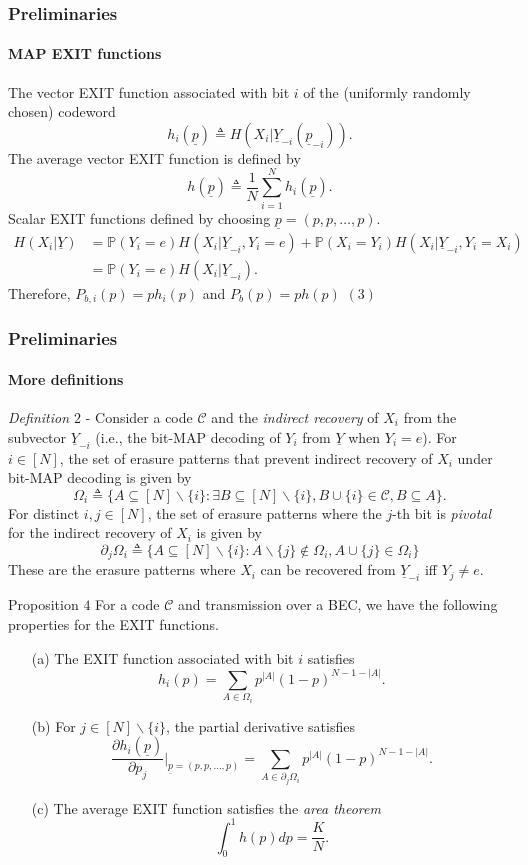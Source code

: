 \documentclass[xcolor=dvipsnames]{beamer}
\begin{document}
\begin{frame}
\frametitle{Preliminaries}
\framesubtitle{MAP EXIT functions}
The vector EXIT function associated with bit $i$ of the (uniformly randomly chosen) codeword $$h_i(\underline{p})\triangleq H(X_i | \underline{Y}_{-i}(\underline{p}_{-i})).$$ The average vector EXIT function is defined by $$h(\underline{p}) \triangleq \frac{1}{N}\sum_{i=1}^N h_i(\underline{p}).$$ Scalar EXIT functions defined by choosing $\underline{p}=(p,p,\ldots,p)$.
\begin{align*}
H(X_i|\underline{Y}) &= \mathbb{P}(Y_i=e)H(X_i|\underline{Y}_{-i}, Y_i=e) + \mathbb{P}(X_i=Y_i)H(X_i|\underline{Y}_{-i}, Y_i=X_i)\\
&= \mathbb{P}(Y_i=e)H(X_i|\underline{Y}_{-i}).
\end{align*}
Therefore, $P_{b,i}(p) = ph_i(p)$ and $P_b(p) = ph(p)$ \hspace{2cm}$(3)$
\end{frame}

\begin{frame}
\frametitle{Preliminaries}
\framesubtitle{More definitions}
\emph{Definition $2$} - Consider a code $\mathcal{C}$ and the \emph{indirect recovery} of $X_i$ from the subvector $\underline{Y}_{-i}$ (i.e., the bit-MAP decoding of $Y_i$ from $\underline{Y}$ when $Y_i=e$). For $i \in [N]$, the set of erasure patterns that prevent indirect recovery of $X_i$ under bit-MAP decoding is given by $$\Omega_i \triangleq \{A \subseteq [N]\backslash\{i\} : \exists B \subseteq [N]\backslash\{i\}, B \cup \{i\} \in \mathcal{C}, B \subseteq A\}.$$ For distinct $i,j \in [N]$, the set of erasure patterns where the $j$-th bit is \emph{pivotal} for the indirect recovery of $X_i$ is given by $$\partial_j\Omega_i \triangleq \{A \subseteq [N]\backslash\{i\}: A\backslash \{j\} \notin \Omega_i, A \cup \{j\} \in \Omega_i \}$$ These are the erasure patterns where $X_i$ can be recovered from $\underline{Y}_{-i}$ iff $Y_j \neq e$.
\end{frame}

\begin{frame}
\begin{block}{Proposition $4$}
For a code $\mathcal{C}$ and transmission over a BEC, we have the following properties for the EXIT functions.
\begin{enumerate}
\item[(a)] The EXIT function associated with bit $i$ satisfies $$h_i(p) = \sum_{A \in \Omega_i} p^{|A|}(1-p)^{N-1-|A|}.$$
\item[(b)] For $j \in [N]\backslash\{i\}$, the partial derivative satisfies $$\frac{\partial h_i(\underline{p})}{\partial p_j}\Bigg|_{\underline{p}=(p,p,\ldots,p)} = \sum_{A \in \partial_j\Omega_i} p^{|A|}(1-p)^{N-1-|A|}.$$
\item[(c)]The average EXIT function satisfies the \emph{area theorem} $$\int_0^1 h(p)dp = \frac{K}{N}.$$
\end{enumerate}
\end{block}
\end{frame}
\end{document}
